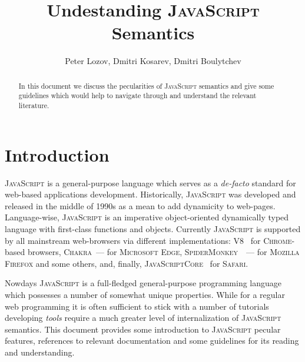 \documentclass{article}
\date{}
\newcommand{\js}{\textsc{JavaScript}\xspace}
\begin{document}
\title{Undestanding \js Semantics}

\author{Peter Lozov, Dmitri Kosarev, Dmitri Boulytchev}

\maketitle

\begin{abstract}
  In this document we discuss the pecularities of \js semantics and give some
  guidelines which would help to navigate through and understand the relevant
  literature.
\end{abstract}

\section{Introduction}

\js is a general-purpose language which serves as a \emph{de-facto} standard for web-based
applications development. Historically, \js was developed and released in the middle of 1990s
as a mean to add dynamicity to web-pages. Language-wise, \js is an imperative object-oriented
dynamically typed language with first-class functions and objects. Currently \js is
supported by all mainstream web-browsers via different implementations: \textsc{V8}~\cite{V8}
for \textsc{Chrome}-based browsers, \textsc{Chakra}~--- for \textsc{Microsoft Edge},
\textsc{SpiderMonkey}~\cite{SpiderMonkey}~--- for \textsc{Mozilla Firefox} and some others, and,
finally, \textsc{JavaScriptCore}~\cite{JavaScriptCore} for \textsc{Safari}.

Nowdays \js is a full-fledged general-purpose programming language which possesses a number of
somewhat unique properties. While for a regular web programming it is often sufficient to
stick with a number of tutorials~\cite{Tutorial} developing \emph{tools} require a
much greater level of internalization of \js semantics. This document provides some
introduction to \js pecular features, references to relevant documentation and
some guidelines for its reading and understanding. 
\end{document}
